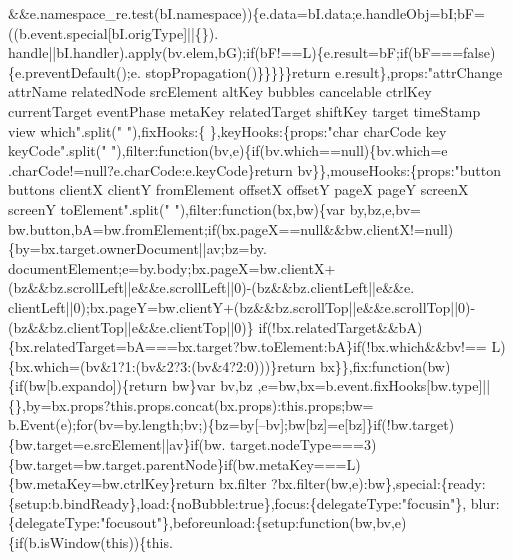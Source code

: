 \begin{DoxyCode}
      &&e.namespace\_re.test(bI.namespace))\{e.data=bI.data;e.handleObj=bI;bF=((b.event.special[bI.origType]||\{\}).
      handle||bI.handler).apply(bv.elem,bG);\textcolor{keywordflow}{if}(bF!==L)\{e.result=bF;\textcolor{keywordflow}{if}(bF===\textcolor{keyword}{false})\{e.preventDefault();e.
      stopPropagation()\}\}\}\}\}\textcolor{keywordflow}{return} e.result\},props:\textcolor{stringliteral}{"attrChange attrName relatedNode srcElement altKey bubbles cancelable
       ctrlKey currentTarget eventPhase metaKey relatedTarget shiftKey target timeStamp view which"}.split(\textcolor{stringliteral}{" "}),fixHooks:\{
      \},keyHooks:\{props:\textcolor{stringliteral}{"char charCode key keyCode"}.split(\textcolor{stringliteral}{" "}),filter:\textcolor{keyword}{function}(bv,e)\{\textcolor{keywordflow}{if}(bv.which==null)\{bv.which=e
      .charCode!=null?e.charCode:e.keyCode\}\textcolor{keywordflow}{return} bv\}\},mouseHooks:\{props:\textcolor{stringliteral}{"button buttons clientX clientY
       fromElement offsetX offsetY pageX pageY screenX screenY toElement"}.split(\textcolor{stringliteral}{" "}),filter:\textcolor{keyword}{function}(bx,bw)\{var by,bz,e,bv=
      bw.button,bA=bw.fromElement;\textcolor{keywordflow}{if}(bx.pageX==null&&bw.clientX!=null)\{by=bx.target.ownerDocument||av;bz=by.
      documentElement;e=by.body;bx.pageX=bw.clientX+(bz&&bz.scrollLeft||e&&e.scrollLeft||0)-(bz&&bz.clientLeft||e&&e.
      clientLeft||0);bx.pageY=bw.clientY+(bz&&bz.scrollTop||e&&e.scrollTop||0)-(bz&&bz.clientTop||e&&e.clientTop||0)\}\textcolor{keywordflow}{
      if}(!bx.relatedTarget&&bA)\{bx.relatedTarget=bA===bx.target?bw.toElement:bA\}\textcolor{keywordflow}{if}(!bx.which&&bv!==
      L)\{bx.which=(bv&1?1:(bv&2?3:(bv&4?2:0)))\}\textcolor{keywordflow}{return} bx\}\},fix:\textcolor{keyword}{function}(bw)\{\textcolor{keywordflow}{if}(bw[b.expando])\{\textcolor{keywordflow}{return} bw\}var bv,bz
      ,e=bw,bx=b.event.fixHooks[bw.type]||\{\},by=bx.props?this.props.concat(bx.props):this.props;bw=
      b.Event(e);\textcolor{keywordflow}{for}(bv=by.length;bv;)\{bz=by[--bv];bw[bz]=e[bz]\}\textcolor{keywordflow}{if}(!bw.target)\{bw.target=e.srcElement||av\}\textcolor{keywordflow}{if}(bw.
      target.nodeType===3)\{bw.target=bw.target.parentNode\}\textcolor{keywordflow}{if}(bw.metaKey===L)\{bw.metaKey=bw.ctrlKey\}\textcolor{keywordflow}{return} bx.filter
      ?bx.filter(bw,e):bw\},special:\{ready:\{setup:b.bindReady\},load:\{noBubble:\textcolor{keyword}{true}\},focus:\{delegateType:\textcolor{stringliteral}{"focusin"}\},
      blur:\{delegateType:\textcolor{stringliteral}{"focusout"}\},beforeunload:\{setup:\textcolor{keyword}{function}(bw,bv,e)\{\textcolor{keywordflow}{if}(b.isWindow(\textcolor{keyword}{this}))\{this.

\end{DoxyCode}
